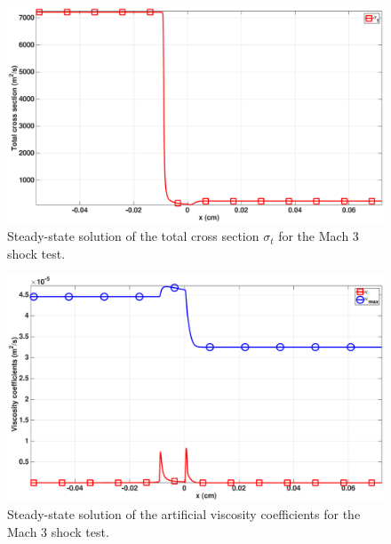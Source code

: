 \documentclass[review]{elsarticle}
\begin{document}
%
\begin{figure}[H]
    \centering
    \includegraphics[width=\textwidth]{figures/dpt-xs/mach_3_nel_1000_total_cross_section.eps}
    \caption{Steady-state solution of the total cross section $\sigma_t$ for the Mach 3 shock test.}\label{fig:mach-3-dpt-xs-visc}
\end{figure}
%
\begin{figure}[H]
    \centering
    \includegraphics[width=\textwidth]{figures/dpt-xs/mach_3_nel_1000_viscosity.eps}
    \caption{Steady-state solution of the artificial viscosity coefficients for the Mach 3 shock test.}\label{fig:mach-3-dpt-xs-visc}
\end{figure}
%
\end{document}
